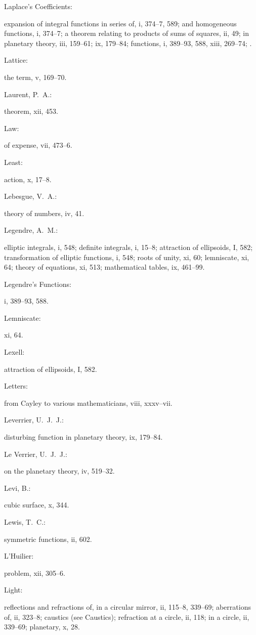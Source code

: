 \documentclass[11pt,a4paper]{book}
\providecommand{\V}[1]{#1}
\providecommand{\IndexEntry}[2]{#1\dotfill #2\par}
\begin{document}
\IndexEntry{Laplace's Coefficients}: expansion of integral functions in series of, \V{i}, 374--7, 589; and homogeneous functions, \V{i}, 374--7; a theorem relating to products of sums of squares, \V{ii}, 49; in planetary theory, \V{iii}, 159--61; \V{ix}, 179--84; functions, \V{i}, 389--93, 588, \V{xiii}, 269--74; .

\IndexEntry{Lattice}: the term, \V{v}, 169--70.

\IndexEntry{Laurent, P.\ A.}: theorem, \V{xii}, 453.

\IndexEntry{Law}: of expense, \V{vii}, 473--6.

\IndexEntry{Least}: action, \V{x}, 17--8.

\IndexEntry{Lebesgue, V.\ A.}: theory of numbers, \V{iv}, 41.

\IndexEntry{Legendre, A.\ M.}: elliptic integrals, \V{i}, 548; definite integrals, \V{i}, 15--8; attraction of ellipsoids, \V{I}, 582; transformation of elliptic functions, \V{i}, 548; roots of unity, \V{xi}, 60; lemniscate, \V{xi}, 64; theory of equations, \V{xi}, 513; mathematical tables, \V{ix}, 461--99.

\IndexEntry{Legendre's Functions}: \V{i}, 389--93, 588.

\IndexEntry{Lemniscate}: \V{xi}, 64.

\IndexEntry{Lexell}: attraction of ellipsoids, \V{I}, 582.

\IndexEntry{Letters}: from Cayley to various mathematicians, \V{viii}, xxxv--vii.

\newpage

\setcounter{page}{109}

\IndexEntry{Leverrier, U.\ J.\ J.}: disturbing function in planetary theory, \V{ix}, 179--84.

\IndexEntry{Le Verrier, U.\ J.\ J.}: on the planetary theory, \V{iv}, 519--32.

\IndexEntry{Levi, B.}: cubic surface, \V{x}, 344.

\IndexEntry{Lewis, T.\ C.}: symmetric functions, \V{ii}, 602.

\IndexEntry{L'Huilier}: problem, \V{xii}, 305--6.

\IndexEntry{Light}: reflections and refractions of, in a circular mirror, \V{ii}, 115--8, 339--69; aberrations of, \V{ii}, 323--8; caustics (see Caustics); refraction at a circle, \V{ii}, 118; in a circle, \V{ii}, 339--69; planetary, \V{x}, 28.
\end{document}
